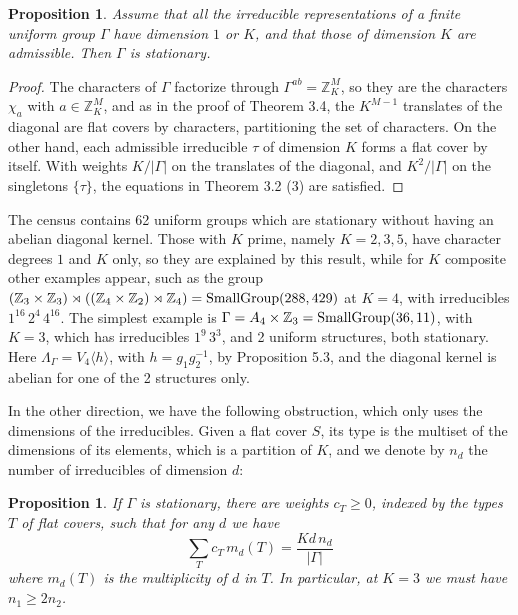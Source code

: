 \documentclass[12pt]{amsart}
\newtheorem{proposition}[theorem]{Proposition}
\theoremstyle{definition}
\begin{document}
\begin{proposition}
Assume that all the irreducible representations of a finite uniform group $\Gamma$ have dimension $1$ or $K$, and that those of dimension $K$ are admissible. Then $\Gamma$ is stationary.
\end{proposition}

\begin{proof}
The characters of $\Gamma$ factorize through $\Gamma^{ab}=\mathbb Z_K^M$, so they are the characters $\chi_a$ with $a\in\mathbb Z_K^M$, and as in the proof of Theorem 3.4, the $K^{M-1}$ translates of the diagonal are flat covers by characters, partitioning the set of characters. On the other hand, each admissible irreducible $\tau$ of dimension $K$ forms a flat cover by itself. With weights $K/|\Gamma|$ on the translates of the diagonal, and $K^2/|\Gamma|$ on the singletons $\{\tau\}$, the equations in Theorem 3.2 (3) are satisfied.
\end{proof}

The census contains 62 uniform groups which are stationary without having an abelian diagonal kernel. Those with $K$ prime, namely $K=2,3,5$, have character degrees $1$ and $K$ only, so they are explained by this result, while for $K$ composite other examples appear, such as the group $(\mathbb Z_3\times\mathbb Z_3)\rtimes((\mathbb Z_4\times\mathbb Z_2)\rtimes\mathbb Z_4)={\rm SmallGroup}(288,429)$ at $K=4$, with irreducibles $1^{16}\,2^4\,4^{16}$. The simplest example is $\Gamma=A_4\times\mathbb Z_3={\rm SmallGroup}(36,11)$, with $K=3$, which has irreducibles $1^9\,3^3$, and 2 uniform structures, both stationary. Here $\Lambda_\Gamma=V_4\langle h\rangle$, with $h=g_1g_2^{-1}$, by Proposition 5.3, and the diagonal kernel is abelian for one of the 2 structures only.

In the other direction, we have the following obstruction, which only uses the dimensions of the irreducibles. Given a flat cover $S$, its type is the multiset of the dimensions of its elements, which is a partition of $K$, and we denote by $n_d$ the number of irreducibles of dimension $d$:

\begin{proposition}
If $\Gamma$ is stationary, there are weights $c_T\geq0$, indexed by the types $T$ of flat covers, such that for any $d$ we have
$$\sum_Tc_T\,m_d(T)=\frac{Kd\,n_d}{|\Gamma|}$$
where $m_d(T)$ is the multiplicity of $d$ in $T$. In particular, at $K=3$ we must have $n_1\geq2n_2$.
\end{proposition}
\end{document}
